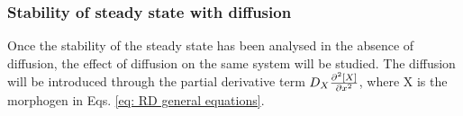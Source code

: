 %
%
%
%
%
%


\subsubsection{Stability of steady state with diffusion}
Once the stability of the steady state has been analysed in the absence of diffusion, the effect of diffusion on the same system will be studied. The diffusion will be introduced through the partial derivative term $D_{X}\frac{\partial^{2} {[X]}}{\partial {x}^{2}}$, where X is the morphogen in Eqs. \eqref{eq: RD general equations}.
